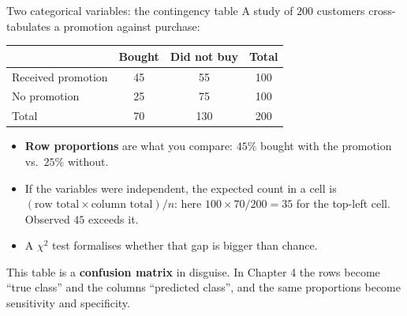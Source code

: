 \documentclass[aspectratio=169,11pt]{beamer}
\begin{document}
\begin{frame}{Two categorical variables: the contingency table}
  \footnotesize
  A study of $200$ customers cross-tabulates a promotion against purchase:
  \begin{center}
  \begin{tabular}{@{}lccc@{}}
    \toprule
     & \textbf{Bought} & \textbf{Did not buy} & \textbf{Total} \\
    \midrule
    Received promotion & 45 & 55 & 100 \\
    No promotion       & 25 & 75 & 100 \\
    \midrule
    Total              & 70 & 130 & 200 \\
    \bottomrule
  \end{tabular}
  \end{center}
  \begin{itemize}
    \item \textbf{Row proportions} are what you compare: $45\%$ bought with the
          promotion vs.\ $25\%$ without.
    \item If the variables were independent, the expected count in a cell is
          $(\text{row total}\times\text{column total})/n$: here
          $100\times70/200 = 35$ for the top-left cell. Observed $45$ exceeds it.
    \item A $\chi^2$ test formalises whether that gap is bigger than chance.
  \end{itemize}
  \begin{takeaway}
    This table is a \textbf{confusion matrix} in disguise. In Chapter 4 the
    rows become ``true class'' and the columns ``predicted class'', and the
    same proportions become sensitivity and specificity.
  \end{takeaway}
\end{frame}
\end{document}
